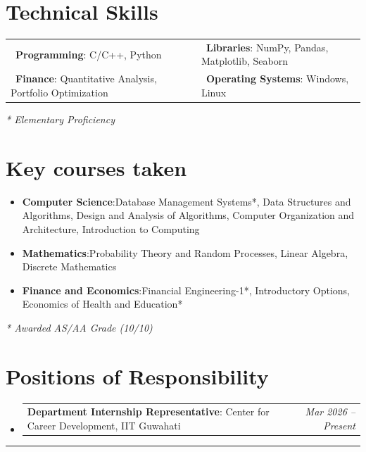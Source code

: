 \documentclass[a4paper,11pt]{article}
\makeatletter
\newcommand{\sbullet}{\raisebox{0.2ex}{\scalebox{0.7}{$\bullet$}}}
\newcommand{\resumeItem}[2]{
  \item{
    \textbf{#1}{:\hspace{0.5mm}#2 \vspace{-0.5mm}}
  }
}
\newcommand{\resumePOR}[3]{
\vspace{0.5mm}\item
    \begin{tabular*}{0.97\textwidth}[t]{l@{\extracolsep{\fill}}r}
        \textbf{#1}:\hspace{0.3mm}#2 & \textit{\small{#3}} 
    \end{tabular*}
    \vspace{-2mm}
}
\newcommand{\resumeSubItem}[2]{\resumeItem{#1}{#2}\vspace{-4pt}}
\newcommand{\resumeSubHeadingListStart}{\begin{itemize}[leftmargin=*,labelsep=0mm]}
\newcommand{\resumeHeadingSkillStart}{\begin{itemize}[leftmargin=*,itemsep=1.7mm, rightmargin=2ex]}
\newcommand{\resumeSubHeadingListEnd}{\end{itemize}\vspace{2mm}}
\newcommand{\resumeHeadingSkillEnd}{\end{itemize}\vspace{-2mm}}
\makeatother
\begin{document}
\section{Technical Skills}
\begin{tabularx}{\textwidth}{@{}X X@{}}
  \sbullet\ \textbf{Programming}: C/C++, Python &
  \sbullet\ \textbf{Libraries}: NumPy, Pandas, Matplotlib, Seaborn \\
  \sbullet\ \textbf{Finance}: Quantitative Analysis, Portfolio Optimization &
  \sbullet\ \textbf{Operating Systems}: Windows, Linux \\
\end{tabularx}
\vspace{-4mm}
\begin{flushright}
\footnotesize\textit{* Elementary Proficiency}
\end{flushright}
\vspace{-11mm}
\section{Key courses taken}
\resumeHeadingSkillStart
\resumeSubItem{Computer Science}
 {Database Management Systems*, Data Structures and Algorithms, Design and Analysis of Algorithms, Computer Organization and Architecture, Introduction to Computing}
 \resumeSubItem{Mathematics} 
    {Probability Theory and Random Processes, Linear Algebra, Discrete Mathematics}
 \resumeSubItem{Finance and Economics} 
    {Financial Engineering-1*, Introductory Options, Economics of Health and Education*}
 \resumeHeadingSkillEnd
 \vspace{-1mm}
\begin{flushright}
\footnotesize\textit{* Awarded AS/AA Grade (10/10)}
\end{flushright}
\vspace{-12.5mm}

\section{Positions of Responsibility}
\vspace{-1mm}
\resumeSubHeadingListStart
\resumePOR{Department Internship Representative} 
    { Center for Career Development, IIT Guwahati} 
    {Mar 2026 -- Present} 
\vspace{-0.5mm}
\resumeSubHeadingListEnd
\vspace{-4mm}

\hspace*{-5mm}\rule{1.035\textwidth}{0.1mm}

\end{document}
